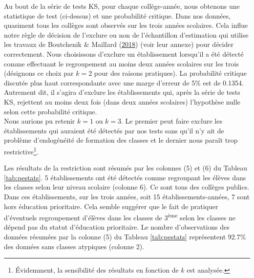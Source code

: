 \documentclass[
]{book}
\begin{document}
\quad Au bout de la série de tests KS, pour chaque collège-année, nous obtenons une statistique de test (ci-dessus) et une probabilité critique. Dans nos données, quasiment tous les collèges sont observés sur les trois années scolaires. Cela influe notre règle de décision de l'exclure ou non de l'échantillon d'estimation qui utilise les travaux de Boutchenik \& Maillard (\protect\hyperlink{ref-BOU:MAI:18}{2018}) (voir leur annexe) pour décider correctement. Nous choisissons d'exclure un établissement lorsqu'il a été détecté comme effectuant le regroupement au moins deux années scolaires sur les trois (désignons ce choix par \(k = 2\) pour des raisons pratiques). La probabilité critique discutée plus haut correspondante avec une marge d'erreur de 5\% est de 0.1354. Autrement dit, il s'agira d'exclure les établissements qui, après la série de tests KS, rejettent au moins deux fois (dans deux années scolaires) l'hypothèse nulle selon cette probabilité critique.\\
Nous aurions pu retenir \(k = 1\) ou \(k = 3\). Le premier peut faire exclure les établissements qui auraient été détectés par nos tests sans qu'il n'y ait de problème d'endogénéité de formation des classes et le dernier nous paraît trop restrictive\footnote{Évidemment, la sensibilité des résultats en fonction de \(k\) est analysée.}.

\quad Les résultats de la restriction sont résumés par les colonnes (5) et (6) du Tableau \ref{tab:pestats}. 5 établissements ont été détectés comme regroupant les élèves dans les classes selon leur niveau scolaire (colonne 6). Ce sont tous des collèges publics. Dans ces établissements, sur les trois années, soit 15 établissements-années, 7 sont hors éducation prioritaire. Cela semble suggérer que le fait de pratiquer d'éventuels regroupement d'élèves dans les classes de 3\textsuperscript{ème} selon les classes ne dépend pas du statut d'éducation prioritaire. Le nombre d'observations des données résumées par la colonne (5) du Tableau \ref{tab:pestats} représentent 92.7\% des données sans classes atypiques (colonne 2).
\end{document}
